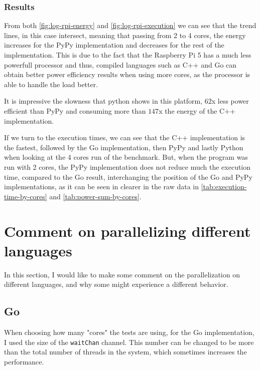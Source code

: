 \subsubsection{Results}






From both \autoref{fig:log-rpi-energy} and \autoref{fig:log-rpi-execution} we can see that the trend lines, in this case intersect, meaning that passing from 2 to 4 cores, the energy increases for the PyPy implementation and decreases for the rest of the implementation. This is due to the fact that the Raspberry Pi 5 has a much less powerfull processor and thus, compiled languages such as C++ and Go can obtain better power efficiency results when using more cores, as the processor is able to handle the load better. 

It is impressive the slowness that python shows in this platform, $62$x less power efficient than PyPy and consuming more than $147$x the energy of the C++ implementation. 

If we turn to the execution times, we can see that the C++ implementation is the fastest, followed by the Go implementation, then PyPy and lastly Python when looking at the 4 cores run of the benchmark. But, when the program was run with 2 cores, the PyPy implementation does not reduce much the execution time, compared to the Go result, interchanging the position of the Go and PyPy implementations, as it can be seen in clearer in the raw data in \autoref{tab:execution-time-by-cores} and \autoref{tab:power-sum-by-cores}.

\section{Comment on parallelizing different languages}

In this section, I would like to make some comment on the parallelization on different languages, and why some might experience a different behavior. 

\subsection{Go}
When choosing how many "cores" the tests are using, for the Go implementation, I used the size of the \texttt{waitChan} channel. This number can be changed to be more than the total number of threads in the system, which sometimes increases the performance.

